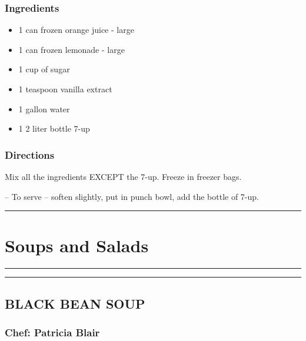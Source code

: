 \documentclass[
]{book}
\providecommand{\tightlist}{%
  \setlength{\itemsep}{0pt}\setlength{\parskip}{0pt}}
\begin{document}
\hypertarget{ingredients-12}{%
\subsection*{Ingredients}\label{ingredients-12}}


\begin{itemize}
\tightlist
\item
  1 can frozen orange juice - large
\item
  1 can frozen lemonade - large
\item
  1 cup of sugar
\item
  1 teaspoon vanilla extract
\item
  1 gallon water
\item
  1 2 liter bottle 7-up
\end{itemize}

\hypertarget{directions-12}{%
\subsection*{Directions}\label{directions-12}}


Mix all the ingredients EXCEPT the 7-up. Freeze in freezer bags.

-- To serve -- soften slightly, put in punch bowl, add the bottle of 7-up.

\begin{center}\rule{0.5\linewidth}{0.5pt}\end{center}

\hypertarget{salad}{%
\chapter{Soups and Salads}\label{salad}}

\begin{center}\rule{0.5\linewidth}{0.5pt}\end{center}

\begin{center}\rule{0.5\linewidth}{0.5pt}\end{center}

\hypertarget{black-bean-soup}{%
\section*{BLACK BEAN SOUP}\label{black-bean-soup}}


\hypertarget{chef-patricia-blair-5}{%
\subsection*{Chef: Patricia Blair}\label{chef-patricia-blair-5}}
\end{document}
